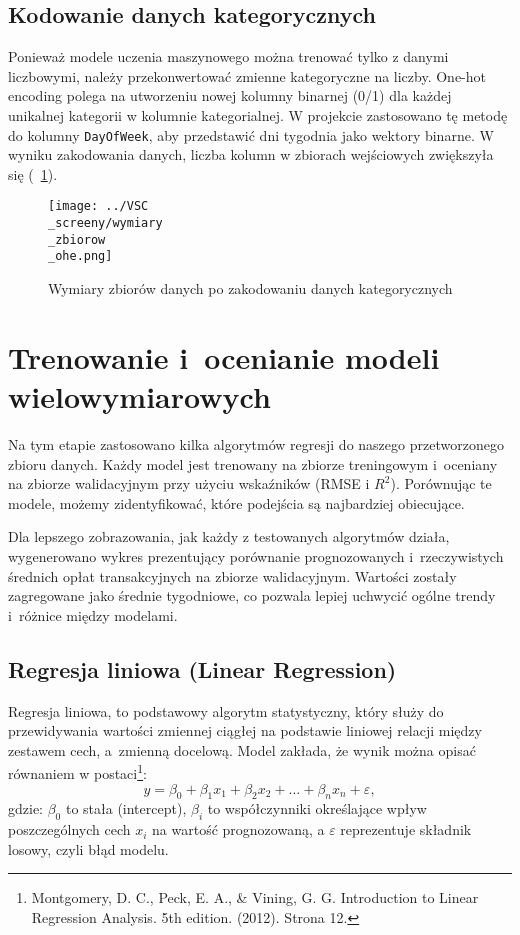 \documentclass[12pt,a4paper]{report}
\theoremstyle{definition} %
\begin{document}
	\subsection{Kodowanie danych kategorycznych}
	\hspace*{\parindent}Ponieważ modele uczenia maszynowego można trenować tylko z danymi liczbowymi, należy przekonwertować zmienne kategoryczne na liczby. One-hot encoding polega na utworzeniu nowej kolumny binarnej (0/1) dla każdej unikalnej kategorii w kolumnie kategorialnej. W projekcie zastosowano tę metodę do kolumny 			\texttt{DayOfWeek}, aby przedstawić dni tygodnia jako wektory binarne. W wyniku zakodowania danych, liczba kolumn w zbiorach wejściowych zwiększyła się (\figurename~\ref{fig:kodowanieDanychKategorycznych}).
	
	\begin{figure}[H]
	    \centering
	    \texttt{[image: ../VSC\\\_screeny/wymiary\\\_zbiorow\\\_ohe.png]} 
	    \caption{Wymiary zbiorów danych po zakodowaniu danych kategorycznych}
	    \label{fig:kodowanieDanychKategorycznych}
	\end{figure}

	\section{Trenowanie i~ocenianie modeli wielowymiarowych}
	\hspace*{\parindent}Na tym etapie zastosowano kilka algorytmów regresji do naszego przetworzonego zbioru danych. Każdy model jest trenowany na zbiorze treningowym i~oceniany na zbiorze walidacyjnym przy użyciu wskaźników (RMSE i $R^2$). Porównując te modele, możemy zidentyfikować, które podejścia są najbardziej obiecujące.

	Dla lepszego zobrazowania, jak każdy z testowanych algorytmów działa, wygenerowano wykres prezentujący porównanie prognozowanych i~rzeczywistych średnich opłat transakcyjnych na zbiorze walidacyjnym. Wartości zostały zagregowane jako średnie tygodniowe, co pozwala lepiej uchwycić ogólne trendy i~różnice między modelami.

	\subsection{Regresja liniowa (Linear Regression)}
	\hspace*{\parindent} Regresja liniowa, to podstawowy algorytm statystyczny, który służy do przewidywania wartości zmiennej ciągłej na podstawie liniowej relacji między zestawem cech, a~zmienną docelową. Model zakłada, że wynik można opisać równaniem w postaci\footnote{Montgomery, D. C., Peck, E. A., \& Vining, G. G. 			Introduction to Linear Regression Analysis. 5th edition. (2012). Strona 12.}:
	\[
	y = \beta_0 + \beta_1 x_1 + \beta_2 x_2 + \dots + \beta_n x_n + \varepsilon,
	\]
	gdzie: $\beta_0$ to stała (intercept), $\beta_i$ to współczynniki określające wpływ poszczególnych cech $x_i$ na wartość prognozowaną, a $\varepsilon$ reprezentuje składnik losowy, czyli błąd modelu.
\end{document}

